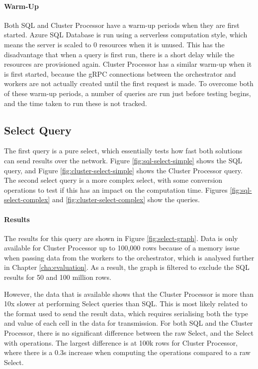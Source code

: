 \paragraph{Warm-Up}
Both SQL and Cluster Processor have a warm-up periods when they are first started. Azure SQL Database is run using a serverless computation style, which means the server is scaled to 0 resources when it is unused. This has the disadvantage that when a query is first run, there is a short delay while the resources are provisioned again. Cluster Processor has a similar warm-up when it is first started, because the gRPC connections between the orchestrator and workers are not actually created until the first request is made. To overcome both of these warm-up periods, a number of queries are run just before testing begins, and the time taken to run these is not tracked.

\subsection{Select Query}
The first query is a pure select, which essentially tests how fast both solutions can send results over the network. Figure \ref{fig:sql-select-simple} shows the SQL query, and Figure \ref{fig:cluster-select-simple} shows the Cluster Processor query. The second select query is a more complex select, with some conversion operations to test if this has an impact on the computation time. Figures \ref{fig:sql-select-complex} and \ref{fig:cluster-select-complex} show the queries.

\paragraph{Results} The results for this query are shown in Figure \ref{fig:select-graph}. Data is only available for Cluster Processor up to 100,000 rows because of a memory issue when passing data from the workers to the orchestrator, which is analysed further in Chapter \ref{cha:evaluation}. As a result, the graph is filtered to exclude the SQL results for 50 and 100 million rows.

However, the data that is available shows that the Cluster Processor is more than 10x slower at performing Select queries than SQL. This is most likely related to the format used to send the result data, which requires serialising both the type and value of each cell in the data for transmission. For both SQL and the Cluster Processor, there is no significant difference between the raw Select, and the Select with operations. The largest difference is at 100k rows for Cluster Processor, where there is a 0.3s increase when computing the operations compared to a raw Select.

